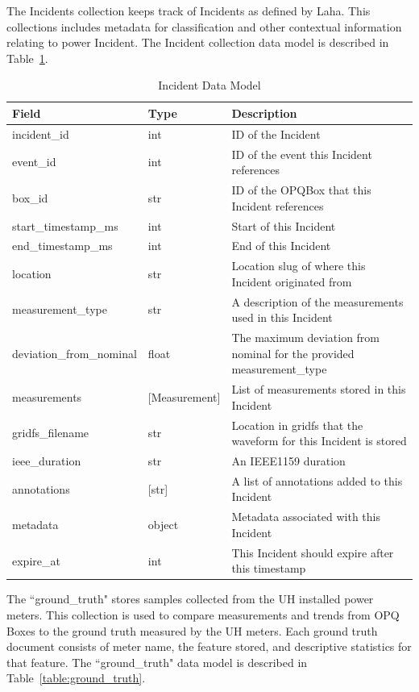 The Incidents collection keeps track of Incidents as defined by Laha. This collections includes metadata for classification and other contextual information relating to power Incident. The Incident collection data model is described in Table~\ref{table:Incidents}.

\begin{table}[H]
	\centering
	\caption{Incident Data Model}
	\begin{tabularx}{\textwidth}{llX}
		\toprule
		\textbf{Field} & \textbf{Type} & \textbf{Description} \\
		\midrule
		incident\_id & int & ID of the Incident \\
		event\_id & int & ID of the event this Incident references \\
		box\_id & str & ID of the OPQBox that this Incident references \\
		start\_timestamp\_ms & int & Start of this Incident \\
		end\_timestamp\_ms & int & End of this Incident \\
		location & str & Location slug of where this Incident originated from \\
		measurement\_type & str & A description of the measurements used in this Incident \\
		deviation\_from\_nominal & float & The maximum deviation from nominal for the provided measurement\_type \\
		measurements & [Measurement] & List of measurements stored in this Incident \\
		gridfs\_filename & str & Location in gridfs that the waveform for this Incident is stored \\
		ieee\_duration & str & An IEEE1159 duration \\
		annotations & [str] & A list of annotations added to this Incident \\
		metadata & object & Metadata associated with this Incident \\
		expire\_at & int & This Incident should expire after this timestamp \\
		\bottomrule
	\end{tabularx}
	\label{table:Incidents}
\end{table}

The ``ground\_truth" stores samples collected from the UH installed power meters. This collection is used to compare measurements and trends from OPQ Boxes to the ground truth measured by the UH meters. Each ground truth document consists of meter name, the feature stored, and descriptive statistics for that feature. The ``ground\_truth" data model is described in Table~\ref{table:ground_truth}.

